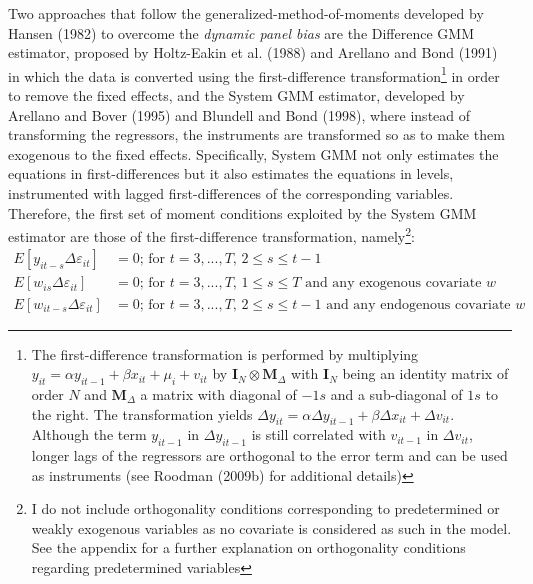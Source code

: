 \documentclass[a4paper, 12pt]{article}
\begin{document}
Two approaches that follow the generalized-method-of-moments developed by Hansen (1982) to overcome the \emph{dynamic panel bias} are the Difference GMM estimator, proposed by Holtz-Eakin et al. (1988) and Arellano and Bond (1991) in which the data is converted using the first-difference transformation\footnote{The first-difference transformation is performed by multiplying $y_{it}=\alpha y_{it-1} + \beta x_{it} + \mu_i+v_{it}$ by $\mathbf{I}_N \otimes \mathbf{M}_{\Delta}$ with $\mathbf{I}_N$ being an identity matrix of order $N$ and $\mathbf{M}_{\Delta}$ a matrix with diagonal of $-1s$ and a sub-diagonal of $1s$ to the right. The transformation yields $\Delta y_{it}=\alpha \Delta y_{it-1} + \beta \Delta x_{it} +\Delta v_{it}$. Although the term $y_{it-1}$ in $\Delta y_{it-1}$ is still correlated with $v_{it-1}$ in $\Delta v_{it}$, longer lags of the regressors are orthogonal to the error term and can be used as instruments (see Roodman (2009b) for additional details)} in order to remove the fixed effects, and the System GMM estimator, developed by Arellano and Bover (1995) and Blundell and Bond (1998), where instead of transforming the regressors, the instruments are transformed so as to make them exogenous to the fixed effects. Specifically, System GMM not only estimates the equations in first-differences but it also estimates the equations in levels, instrumented with lagged first-differences of the corresponding variables. Therefore, the first set of moment conditions exploited by the System GMM estimator are those of the first-difference transformation, namely\footnote{I do not include orthogonality conditions corresponding to predetermined or weakly exogenous variables as no covariate is considered as such in the model. See the appendix for a further explanation on orthogonality conditions regarding predetermined variables}:
\begin{equation}
\label{momentsDiff}
\begin{aligned}
E\left[ y_{it-s}\Delta \varepsilon_{it}\right]&=0 \text{; for $t=3,...,T$, $2\leq s \leq t-1$}\\
E\left[w_{is}\Delta \varepsilon_{it}\right]&=0 \text{; for $t=3,...,T$, $1\leq s \leq T$ and any exogenous covariate $w$}\\
E\left[w_{it-s}\Delta \varepsilon_{it}\right]&=0 \text{; for $t=3,...,T$, $2\leq s \leq t-1$ and any endogenous covariate $w$}
\end{aligned}
\end{equation}
\end{document}

